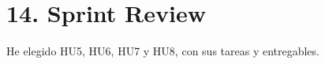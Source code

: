 \documentclass[
11pt, %
]{charter}
\begin{document}
\newpage

\section{14. Sprint Review}
\label{sec:sprint_review}




He elegido HU5, HU6, HU7 y HU8, con sus tareas y entregables.
\end{document}
